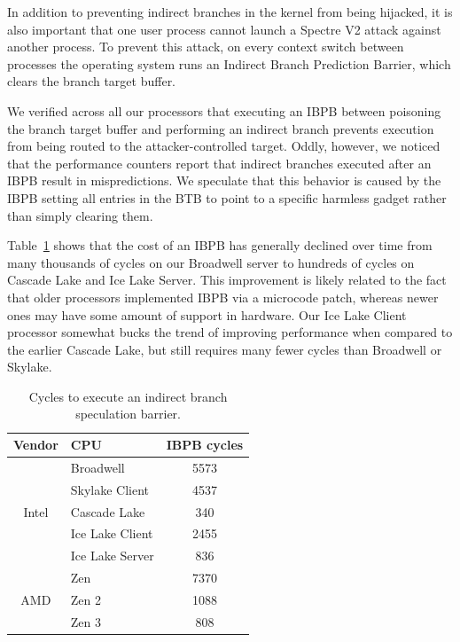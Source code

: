 In addition to preventing indirect branches in the kernel from being
hijacked, it is also important that one user process cannot launch a Spectre V2 attack against another process.
To prevent this attack, on every context switch between processes the operating system runs an Indirect Branch Prediction Barrier, which clears the branch target buffer.

We verified across all our processors that executing an IBPB between poisoning the branch target buffer and performing an indirect branch prevents execution from being routed to the attacker-controlled target.
Oddly, however, we noticed that the performance counters report that indirect branches executed after an IBPB result in mispredictions.
We speculate that this behavior is caused by the IBPB setting all entries in the BTB to point to a specific harmless gadget rather than simply clearing them.

Table~\ref{table:ibpb} shows that the cost of an IBPB has generally
declined over time from many thousands of cycles on our Broadwell
server to hundreds of cycles on Cascade Lake and Ice Lake Server.
This improvement is likely related to the fact that older processors implemented IBPB via a microcode patch, whereas newer ones may have some amount of support in hardware.
Our Ice Lake Client processor somewhat bucks the trend of improving performance when compared to the earlier Cascade Lake, but still requires many fewer cycles than Broadwell or Skylake.

\begin{table}[h]
    \begin{center}
    \begin{tabular}{ clc }
      \textbf{Vendor} & \textbf{CPU} & \textbf{IBPB cycles} \\ \hline

      \multirow{5}{*}{Intel} & Broadwell         & 5573 \\
                             & Skylake Client    & 4537 \\
                             & Cascade Lake      & 340 \\
                             & Ice Lake Client   & 2455 \\
                             & Ice Lake Server   & 836 \\ \hline
      \multirow{3}{*}{AMD}   & Zen               & 7370 \\
                             & Zen 2             & 1088 \\
                             & Zen 3             & 808 \\ \hline
    \end{tabular}
    \end{center}
    \caption{Cycles to execute an indirect branch speculation barrier. }
    \label{table:ibpb}
\end{table}

